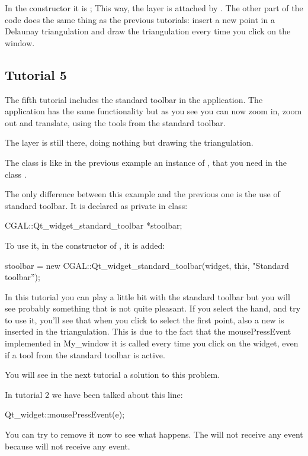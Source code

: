 In the constructor it is ; This way, the layer is
attached by . The other part of the code does the same
thing as the previous tutorials: insert a new point in a Delaunay
triangulation and draw the triangulation every time you click on the window.

\subsection*{Tutorial 5}

The fifth tutorial includes the standard toolbar in the
application. The application has the same functionality but as you
see you can now zoom in, zoom out and translate, using the tools from
the standard toolbar.

The layer is still there, doing nothing but drawing the triangulation.

The class  is like in the previous example an instance of
, that you need in the class .

The only difference between this example and the previous one is the
use of standard toolbar. It is declared as private in  class:
\begin{ccExampleCode}
CGAL::Qt_widget_standard_toolbar *stoolbar;
\end{ccExampleCode}
To use it, in the constructor of , it is added:
\begin{ccExampleCode}
stoolbar = new CGAL::Qt_widget_standard_toolbar(widget, this, "Standard toolbar'');
\end{ccExampleCode}
In this tutorial you can play a little bit with the standard toolbar
but you will see probably something that is not quite pleasant. If you
select the hand, and try to use it, you'll see that when you click to
select the first point, also a new  is inserted in the
triangulation. This is due to the fact that the mousePressEvent
implemented in My\_window it is called every time you click on the
widget, even if a tool from the standard toolbar is active.

You will see in the next tutorial a solution to this problem.

\begin{ccAdvanced}
In tutorial 2 we have been talked about this line:
\begin{ccExampleCode}
Qt_widget::mousePressEvent(e);
\end{ccExampleCode}
You can try to remove it now to see what happens. The 
will not receive any event because  will not receive
any event.
\end{ccAdvanced}


